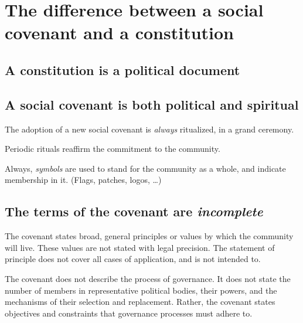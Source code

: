\documentclass[
]{book}
\begin{document}
\hypertarget{the-difference-between-a-social-covenant-and-a-constitution}{%
\section{The difference between a social covenant and a constitution}\label{the-difference-between-a-social-covenant-and-a-constitution}}

\hypertarget{a-constitution-is-a-political-document}{%
\subsection{A constitution is a political document}\label{a-constitution-is-a-political-document}}

\hypertarget{a-social-covenant-is-both-political-and-spiritual}{%
\subsection{A social covenant is both political and spiritual}\label{a-social-covenant-is-both-political-and-spiritual}}

The adoption of a new social covenant is \emph{always} ritualized, in a grand ceremony.

Periodic rituals reaffirm the commitment to the community.

Always, \emph{symbols} are used to stand for the community as a whole, and indicate membership in it. (Flags, patches, logos, \ldots)

\hypertarget{the-terms-of-the-covenant-are-incomplete}{%
\subsection{\texorpdfstring{The terms of the covenant are \emph{incomplete}}{The terms of the covenant are incomplete}}\label{the-terms-of-the-covenant-are-incomplete}}

The covenant states broad, general principles or values by which the community will live. These values are not stated with legal precision. The statement of principle does not cover all cases of application, and is not intended to.

The covenant does not describe the process of governance. It does not state the number of members in representative political bodies, their powers, and the mechanisms of their selection and replacement. Rather, the covenant states objectives and constraints that governance processes must adhere to.
\end{document}
